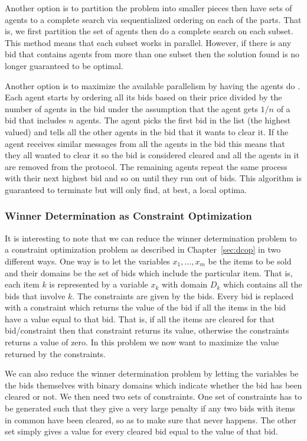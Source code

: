 Another option is to partition the problem into smaller pieces then
have sets of agents to a complete search via sequentialized ordering
on each of the parts. That is, we first partition the set of agents
then do a complete search on each subset. This method means that each
subset works in parallel. However, if there is any bid that contains
agents from more than one subset then the solution found is no longer
guaranteed to be optimal.

Another option is to maximize the available parallelism by having the
agents do . Each agent starts by ordering
all its bids based on their price divided by the number of agents in
the bid under the assumption that the agent gets $1/n$ of a bid that
includes $n$ agents. The agent picks the first bid in the list (the
highest valued) and tells all the other agents in the bid that it
wants to clear it. If the agent receives similar messages from all the
agents in the bid this means that they all wanted to clear it so the
bid is considered cleared and all the agents in it are removed from
the protocol. The remaining agents repeat the same process with their
next highest bid and so on until they run out of bids. This algorithm
is guaranteed to terminate but will only find, at best, a local
optima.


\subsubsection{Winner Determination as Constraint Optimization}
\label{sec:winn-determ-as-1}

It is interesting to note that we can reduce the winner determination
problem to a constraint optimization problem as described in
Chapter~\ref{sec:dcop} in two different ways. One way is to let the
variables $x_1,\ldots,x_m$ be the items to be sold and their domains
be the set of bids which include the particular item. That is, each
item $k$ is represented by a variable $x_k$ with domain $D_k$ which
contains all the bids that involve $k$. The constraints are given by
the bids. Every bid is replaced with a constraint which returns the
value of the bid if all the items in the bid have a value equal to
that bid. That is, if all the items are cleared for that
bid/constraint then that constraint returns its value, otherwise the
constraints returns a value of zero. In this problem we now want to
maximize the value returned by the constraints.

We can also reduce the winner determination problem by letting the
variables be the bids themselves with binary domains which indicate
whether the bid has been cleared or not. We then need two sets of
constraints. One set of constraints has to be generated such that they
give a very large penalty if any two bids with items in common have
been cleared, so as to make sure that never happens. The other set
simply gives a value for every cleared bid equal to the value of that
bid. 

